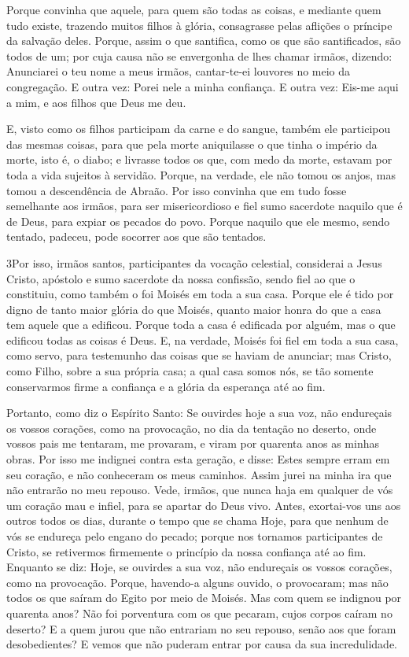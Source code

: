 Porque convinha que aquele, para quem são todas as coisas, e
mediante quem tudo existe, trazendo muitos filhos à glória,
consagrasse pelas aflições o príncipe da salvação deles.
Porque, assim o que santifica, como os que são santificados,
são todos de um; por cuja causa não se envergonha de lhes chamar
irmãos, dizendo: Anunciarei o teu nome a meus irmãos,
cantar-te-ei louvores no meio da congregação. E outra vez:
Porei nele a minha confiança. E outra vez: Eis-me aqui a mim, e aos
filhos que Deus me deu.

E, visto como os filhos participam da carne e do sangue, também
ele participou das mesmas coisas, para que pela morte aniquilasse o
que tinha o império da morte, isto é, o diabo; e livrasse
todos os que, com medo da morte, estavam por toda a vida sujeitos à
servidão. Porque, na verdade, ele não tomou os anjos, mas
tomou a descendência de Abraão. Por isso convinha que em tudo
fosse semelhante aos irmãos, para ser misericordioso e fiel sumo
sacerdote naquilo que é de Deus, para expiar os pecados do povo.
Porque naquilo que ele mesmo, sendo tentado, padeceu, pode
socorrer aos que são tentados.

\medskip

\lettrine{3} Por isso, irmãos santos, participantes da vocação
celestial, considerai a Jesus Cristo, apóstolo e sumo sacerdote da
nossa confissão, sendo fiel ao que o constituiu, como também o
foi Moisés em toda a sua casa. Porque ele é tido por digno de
tanto maior glória do que Moisés, quanto maior honra do que a casa
tem aquele que a edificou. Porque toda a casa é edificada por
alguém, mas o que edificou todas as coisas é Deus. E, na
verdade, Moisés foi fiel em toda a sua casa, como servo, para
testemunho das coisas que se haviam de anunciar; mas Cristo,
como Filho, sobre a sua própria casa; a qual casa somos nós, se tão
somente conservarmos firme a confiança e a glória da esperança até
ao fim.

Portanto, como diz o Espírito Santo: Se ouvirdes hoje a sua voz,
não endureçais os vossos corações, como na provocação, no dia da
tentação no deserto, onde vossos pais me tentaram, me provaram,
e viram por quarenta anos as minhas obras. Por isso me
indignei contra esta geração, e disse: Estes sempre erram em seu
coração, e não conheceram os meus caminhos. Assim jurei na
minha ira que não entrarão no meu repouso. Vede, irmãos, que
nunca haja em qualquer de vós um coração mau e infiel, para se
apartar do Deus vivo. Antes, exortai-vos uns aos outros todos
os dias, durante o tempo que se chama Hoje, para que nenhum de vós
se endureça pelo engano do pecado; porque nos tornamos
participantes de Cristo, se retivermos firmemente o princípio da
nossa confiança até ao fim. Enquanto se diz: Hoje, se
ouvirdes a sua voz, não endureçais os vossos corações, como na
provocação. Porque, havendo-a alguns ouvido, o provocaram;
mas não todos os que saíram do Egito por meio de Moisés. Mas
com quem se indignou por quarenta anos? Não foi porventura com os
que pecaram, cujos corpos caíram no deserto? E a quem jurou
que não entrariam no seu repouso, senão aos que foram desobedientes?
E vemos que não puderam entrar por causa da sua
incredulidade.

